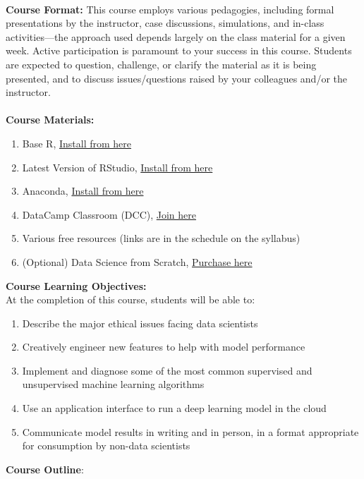 \documentclass[11pt]{article}
\begin{document}
\textbf {\large \\ Course Format:} This course employs various pedagogies, including formal presentations by the instructor, case discussions, simulations, and in-class activities---the approach used depends largely on the class material for a given week. Active participation is paramount to your success in this course. Students are expected to question, challenge, or clarify the material as it is being presented, and to discuss issues/questions raised by your colleagues and/or the instructor.  \\\\


\textbf {\large Course Materials:}
\begin{enumerate} 
\itemsep-0.4em
  \item Base R, \href{https://cran.r-project.org/}{Install from here}
  \item Latest Version of RStudio, \href{https://www.rstudio.com/products/rstudio/download}{Install from here}
  \item Anaconda, \href{https://www.anaconda.com/}{Install from here}
  \item DataCamp Classroom (DCC), \href{https://www.datacamp.com/groups/shared_links/db3e44b82178c299ff29d556b1dc88766f38317e}{Join here}
  \item Various free resources (links are in the schedule on the syllabus)
  \item (Optional) Data Science from Scratch, \href{https://www.amazon.com/Data-Science-Scratch-Principles-Python/dp/1492041130/}{Purchase here}
  \end{enumerate}

\newpage



\textbf {\large Course Learning Objectives:} \\
At the completion of this course, students will be able to:
{\footnotesize
\begin{enumerate} 
	\item Describe the major ethical issues facing data scientists
	\item Creatively engineer new features to help with model performance
	\item Implement and diagnose some of the most common supervised and unsupervised machine learning algorithms
	\item Use an application interface to run a deep learning model in the cloud
	\item Communicate model results in writing and in person, in a format appropriate for consumption by non-data scientists
\end{enumerate}
}
\textbf {\large Course Outline}:
\end{document}
